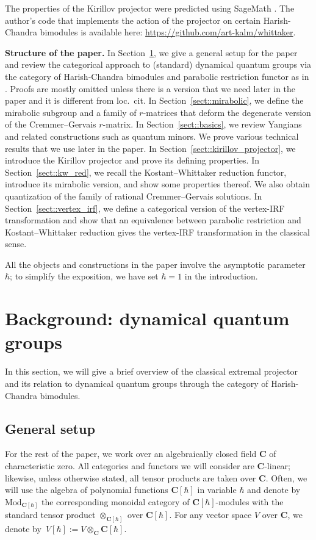 \documentclass[pdftex]{sigma}
\numberwithin{equation}{section}
\newcommand{\C}{\mathbf{C}}
\newcommand{\Mod}[1]{{\mathrm{Mod}}_{#1}}
\begin{document}
	The properties of the Kirillov projector were predicted using SageMath \cite{SageMath}. The author's code that implements the action of the projector on certain Harish-Chandra bimodules is available here: \url{https://github.com/art-kalm/whittaker}.
	
	
{\bf Structure of the paper.} In Section~\ref{sect::dynamical_quantum_groups}, we give a general setup for the paper and review the categorical approach to (standard) dynamical quantum groups via the category of Harish-Chandra bimodules and parabolic restriction functor as in \cite{KalmykovSafronov}. Proofs are mostly omitted unless there is a version that we need later in the paper and it is different from loc.\ cit. In Section~\ref{sect::mirabolic}, we define the mirabolic subgroup and a family of $r$-matrices that deform the degenerate version of the Cremmer--Gervais $r$-matrix. In Section~\ref{sect::basics}, we review Yangians and related constructions such as quantum minors. We prove various technical results that we use later in the paper. In Section~\ref{sect::kirillov_projector}, we introduce the Kirillov projector and prove its defining properties. In Section~\ref{sect::kw_red}, we recall the Kostant--Whittaker reduction functor, introduce its mirabolic version, and show some properties thereof. We also obtain quantization of the family of rational Cremmer--Gervais solutions. In Section~\ref{sect::vertex_irf}, we define a categorical version of the vertex-IRF transformation and show that an equivalence between parabolic restriction and Kostant--Whittaker reduction gives the vertex-IRF transformation in the classical sense.
	
	All the objects and constructions in the paper involve the asymptotic parameter $\hbar$; to simplify the exposition, we have set $\hbar=1$ in the introduction.
	
	
	
	\section{Background: dynamical quantum groups}
	\label{sect::dynamical_quantum_groups}
	
	\renewcommand{\theequation}{\arabic{section}.\arabic{equation}}
	
	In this section, we will give a brief overview of the classical extremal projector and its relation to dynamical quantum groups through the category of Harish-Chandra bimodules.
	
	\subsection{General setup}
	\label{subsect::general_setup}
	For the rest of the paper, we work over an algebraically closed field $\C$ of characteristic zero. All categories and functors we will consider are $\C$-linear; likewise, unless otherwise stated, all tensor products are taken over $\C$. Often, we will use the algebra of polynomial functions $\C[\hbar]$ in variable $\hbar$ and denote by $\Mod{\C[\hbar]}$ the corresponding monoidal category of $\C[\hbar]$-modules with the standard tensor product $\otimes_{\C[\hbar]}$ over $\C[\hbar]$. For any vector space $V$ over $\C$, we denote by~${V[\hbar]:= V \otimes_{\C} \C[\hbar]}$.
	
\end{document}
